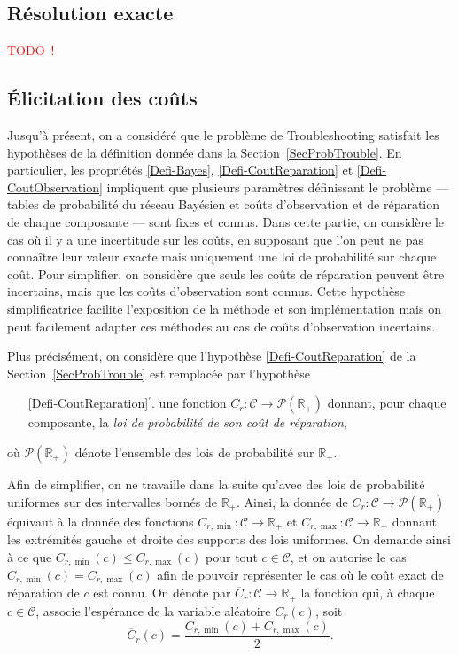 \documentclass[a4paper,11pt]{article}
\theoremstyle{plain}
\theoremstyle{definition}
\begin{document}
\subsection{Résolution exacte}
\label{SecExacte}

\textcolor{red}{TODO~!}

\subsection{Élicitation des coûts}
\label{SecContribElicitation}

Jusqu'à présent, on a considéré que le problème de Troubleshooting satisfait les hypothèses de la définition donnée dans la Section~\ref{SecProbTrouble}. En particulier, les propriétés \ref{Defi-Bayes}, \ref{Defi-CoutReparation} et \ref{Defi-CoutObservation} impliquent que plusieurs paramètres définissant le problème --- tables de probabilité du réseau Bayésien et coûts d'observation et de réparation de chaque composante --- sont fixes et connus. Dans cette partie, on considère le cas où il y a une incertitude sur les coûts, en supposant que l'on peut ne pas connaître leur valeur exacte mais uniquement une loi de probabilité sur chaque coût. Pour simplifier, on considère que seuls les coûts de réparation peuvent être incertains, mais que les coûts d'observation sont connus. Cette hypothèse simplificatrice facilite l'exposition de la méthode et son implémentation mais on peut facilement adapter ces méthodes au cas de coûts d'observation incertains.

Plus précisément, on considère que l'hypothèse \ref{Defi-CoutReparation} de la Section~\ref{SecProbTrouble} est remplacée par l'hypothèse
\begin{enumerate}
\item[\ref{Defi-CoutReparation}$^\prime$.] une fonction $C_r: \mathcal C \to \mathcal P(\mathbb R_+)$ donnant, pour chaque composante, la \emph{loi de probabilité de son coût de réparation},
\end{enumerate}
où $\mathcal P(\mathbb R_+)$ dénote l'ensemble des lois de probabilité sur $\mathbb R_+$.

Afin de simplifier, on ne travaille dans la suite qu'avec des lois de probabilité uniformes sur des intervalles bornés de $\mathbb R_+$. Ainsi, la donnée de $C_r: \mathcal C \to \mathcal P(\mathbb R_+)$ équivaut à la donnée des fonctions $C_{r, \min}: \mathcal C \to \mathbb R_+$ et $C_{r, \max}: \mathcal C \to \mathbb R_+$ donnant les extrémités gauche et droite des supports des lois uniformes. On demande ainsi à ce que $C_{r, \min}(c) \leq C_{r, \max}(c)$ pour tout $c \in \mathcal C$, et on autorise le cas $C_{r, \min}(c) = C_{r, \max}(c)$ afin de pouvoir représenter le cas où le coût exact de réparation de $c$ est connu. On dénote par $\overline C_r: \mathcal C \to \mathbb R_+$ la fonction qui, à chaque $c \in \mathcal C$, associe l'espérance de la variable aléatoire $C_r(c)$, soit
\[\overline C_r(c) = \frac{C_{r, \min}(c) + C_{r, \max}(c)}{2}.\]
\end{document}
